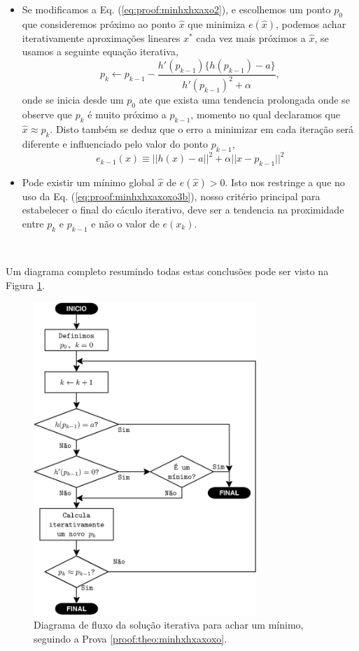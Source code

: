 \begin{myproofT}
\begin{itemize}
\item Se modificamos a Eq. (\ref{eq:proof:minhxhxaxo2}), e escolhemos um ponto  
$p_0$ que consideremos próximo ao ponto $\hat{x}$ que minimiza $e(\hat{x})$,
podemos achar iterativamente aproximações lineares $x^*$ cada vez mais próximos a  $\hat{x}$,
se usamos a seguinte equação iterativa,
\begin{equation}\label{eq:proof:minhxhxaxoxo3b}
p_{k} \leftarrow p_{k-1} - \frac{h'(p_{k-1})\{h(p_{k-1})-a\}}{h'(p_{k-1})^2 +\alpha},
\end{equation}
onde se inicia desde um $p_{0}$ 
ate que exista uma tendencia prolongada onde se observe que $p_{k}$ é muito próximo a $p_{k-1}$,
momento no qual declaramos que $\hat{x} \approx p_{k}$.
Disto também se deduz que o erro a minimizar em cada iteração será diferente e influenciado pelo valor do ponto $p_{k-1}$,
\begin{equation}
e_{k-1}(x)  \equiv ||h(x)-a||^2+\alpha||x-p_{k-1}||^2
\end{equation}
\item Pode existir um mínimo global $\hat{x}$ de $e(\hat{x}) > 0$.
Isto nos restringe a que no uso da Eq. (\ref{eq:proof:minhxhxaxoxo3b}),
nosso critério principal para estabelecer o final do cáculo iterativo,
deve ser a tendencia na  proximidade entre $p_{k}$ e $p_{k-1}$ 
e não o valor de $e(x_k)$.
\end{itemize}~

Um diagrama completo resumindo todas estas conclusões pode ser visto na Figura \ref{fig:fluxohx3}.
\end{myproofT}
\begin{figure}[!h]
     \centering
         \includegraphics[width=0.75\textwidth]{chapters/minimization-hx/fluxo3.eps}
        \caption{Diagrama de fluxo da solução iterativa para achar um mínimo, seguindo a Prova \ref{proof:theo:minhxhxaxoxo}.}
        \label{fig:fluxohx3}
\end{figure}
